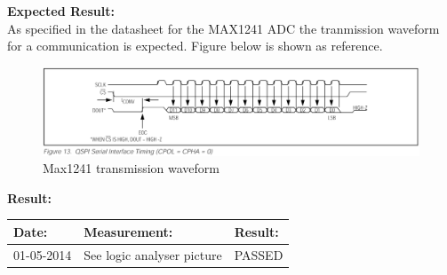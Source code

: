 \begin{figure}[H]
	\centering
\end{figure}

\textbf{Expected Result:}\\
As specified in the datasheet for the MAX1241 ADC the tranmission waveform for a communication is expected. Figure below is shown as reference.

\begin{figure}[H]
	\centering
	\includegraphics[width=.9\textwidth]{billeder/ADC_waveform}
	\caption{Max1241 transmission waveform}
\end{figure}


\textbf{Result:}
\begin{table}[H]
	\centering
	\begin{tabular}{|p{2cm}|p{4.2cm}|p{2cm}|}\hline
		\textbf{Date:} & \textbf{Measurement:} & \textbf{Result:} \\ \hline
	 	01-05-2014 & See logic analyser picture & PASSED \\ \hline
	\end{tabular}
\end{table}

